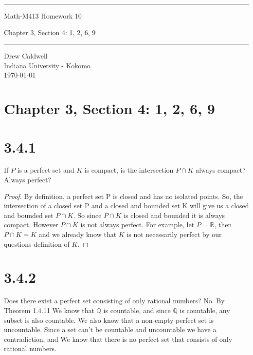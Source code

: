 \documentclass{article}
\begin{document}
\begin{titlepage}
\scshape
\centering
\raisebox{-\baselineskip}{\rule{\textwidth}{1px}}
\vspace{.3cm}
\rule{\textwidth}{.5px}
\vspace{.3cm}
{\huge{{Math-M413 Homework 10}}}\par \vspace{0.3cm}
Chapter 3, Section 4: 1, 2, 6, 9
\rule{\textwidth}{2px}

\large{Drew Caldwell}\\
\large{Indiana University - Kokomo}\\
\vspace{1.3cm}
\vfill
\today
\end{titlepage}

\section*{Chapter 3, Section 4: 1, 2, 6, 9}

\section*{3.4.1}
If $P$ is a perfect set and $K$ is compact, is the intersection
 $P \cap K$ always compact? Always perfect?

\begin{proof}
By definition, a perfect set P is closed and has no isolated 
points. So, the intersection of a closed set P and a closed 
and bounded set K will give us a closed and bounded set $P 
\cap K$. So since $P \cap K$ is closed and bounded it is 
always compact. However $P \cap K$ is not always perfect. 
For example, let $P = \mathbb{R}$, then $P \cap K = K$ and 
we already know that $K$ is not necessarily perfect by our 
questions definition of $K$.
\end{proof}

\section*{3.4.2}
Does there exist a perfect set consisting of only rational 
numbers?
\newline
\newline
No. By Theorem 1.4.11 We know that $\mathbb{Q}$ is countable,
 and since $\mathbb{Q}$ is countable, any subset is also 
 countable. We also know that a non-empty perfect set is 
 uncountable. Since a set can't be countable and uncountable 
 we have a contradiction, and We know that there is no perfect 
 set that consists of only rational numbers.
\end{document}
